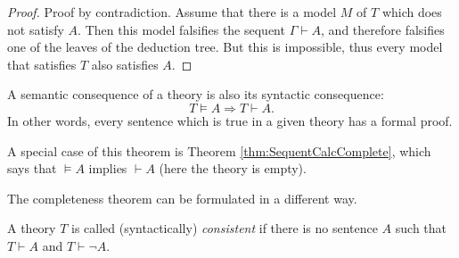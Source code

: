 \begin{page}
\setcounter{section}{3}
\setcounter{subsection}{2}
\setcounter{dfn}{17}
\label{portion:628}

\begin{proof}
Proof by contradiction.
Assume that there is a model $M$ of $T$ which does not satisfy $A$.
Then this model falsifies the sequent $\Gamma \vdash A$, and therefore falsifies one of the leaves of the deduction tree.
But this is impossible, thus every model that satisfies $T$ also satisfies $A$.
\end{proof}



\end{page}

\begin{page}
\setcounter{section}{3}
\setcounter{subsection}{2}
\setcounter{dfn}{18}
\label{portion:630}

\begin{thm}
\label{thm:Complete1}
A semantic consequence of a theory is also its syntactic consequence:
\[
T \vDash A \Rightarrow T \vdash A.
\]
In other words, every sentence which is true in a given theory has a formal proof.
\end{thm}

\end{page}

\begin{page}
\setcounter{section}{3}
\setcounter{subsection}{2}
\setcounter{dfn}{18}
\label{portion:631}


A special case of this theorem is Theorem \ref{thm:SequentCalcComplete}, which says that $\vDash A$ implies $\vdash A$
(here the theory is empty).


The completeness theorem can be formulated in a different way.


\end{page}

\begin{page}
\setcounter{section}{3}
\setcounter{subsection}{2}
\setcounter{dfn}{19}
\label{portion:633}

\begin{dfn}
A theory $T$ is called (syntactically) \emph{consistent} if there is no sentence $A$ such that $T \vdash A$ and $T \vdash \neg A$.
\end{dfn}

\end{page}

